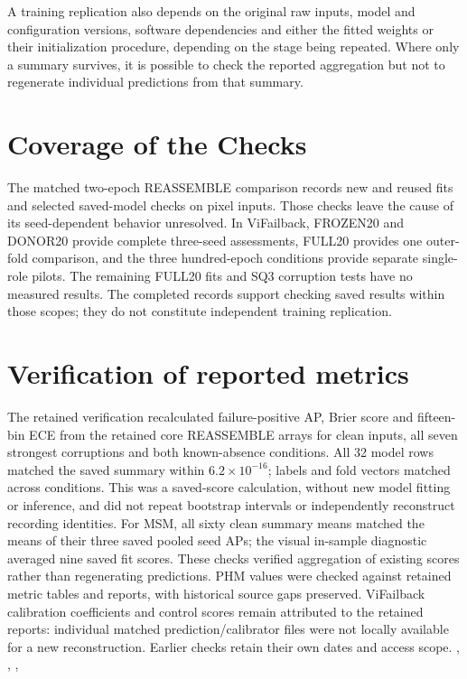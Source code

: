 A training replication also depends on the original raw inputs, model and configuration
versions, software dependencies and either the fitted weights or their initialization
procedure, depending on the stage being repeated. Where only a summary survives, it is
possible to check the reported aggregation but not to regenerate individual predictions
from that summary.

\section{Coverage of the Checks}
The matched two-epoch REASSEMBLE comparison records new and reused fits and selected
saved-model checks on pixel inputs. Those checks leave the cause of its seed-dependent
behavior unresolved. In ViFailback, FROZEN20 and DONOR20 provide complete three-seed
assessments, FULL20 provides one outer-fold comparison, and the three hundred-epoch
conditions provide separate single-role pilots. The remaining FULL20 fits and SQ3
corruption tests have no measured results. The completed records support checking saved
results within those scopes; they do not constitute independent training replication.

\section{Verification of reported metrics}
The retained verification recalculated failure-positive AP, Brier score and fifteen-bin
ECE from the retained core REASSEMBLE arrays for clean inputs, all seven strongest
corruptions and both known-absence conditions. All 32 model rows matched the saved
summary within $6.2\times10^{-16}$; labels and fold vectors matched across conditions.
This was a saved-score calculation, without new model fitting or inference, and did not
repeat bootstrap intervals or independently reconstruct recording identities.
For MSM, all sixty clean summary means matched the means of their three saved pooled
seed APs; the visual in-sample diagnostic averaged nine saved fit scores.
These checks verified aggregation of existing scores rather than regenerating predictions.
PHM values were checked against retained metric tables and reports, with historical
source gaps preserved. ViFailback calibration coefficients and control scores remain
attributed to the retained reports: individual matched prediction/calibrator files were
not locally available for a new reconstruction. Earlier checks
retain their own dates and access scope.
{, , , }

